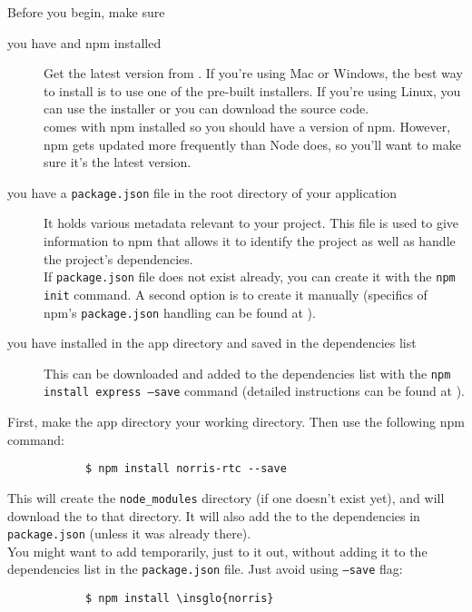 		Before you begin, make sure
		\begin{description}
			\item[you have  and npm installed] Get the latest version from . If you're using Mac or Windows, the best way to install  is to use one of the pre-built installers. If you're using Linux, you can use the installer or you can download the source code.\\
			 comes with npm installed so you should have a version of npm. However, npm gets updated more frequently than Node does, so you'll want to make sure it's the latest version.
			\item[you have a \texttt{package.json} file in the root directory of your application] It holds various metadata relevant to your project. This file is used to give information to npm that allows it to identify the project as well as handle the project's dependencies.\\
			If \texttt{package.json} file does not exist already, you can create it with the \texttt{npm init} command. A second option is to create it manually (specifics of npm's \texttt{package.json} handling can be found at ).
			\item[you have  installed in the app directory and saved in the dependencies list] This  can be downloaded and added to the dependencies list with the \texttt{npm install express --save} command (detailed instructions can be found at ).
		\end{description}
		First, make the app directory your working directory. Then use the following npm command:
		\begin{lstlisting}
			$ npm install norris-rtc --save
		\end{lstlisting}
		This will create the \texttt{node\_modules} directory (if one doesn't exist yet), and will download the  to that directory. It will also add the  to the dependencies in \texttt{package.json} (unless it was already there).\\
		You might want to add  temporarily, just to it out, without adding it to the dependencies list in the \texttt{package.json} file. Just avoid using \texttt{--save} flag:
		\begin{lstlisting}
			$ npm install \insglo{norris}
		\end{lstlisting}